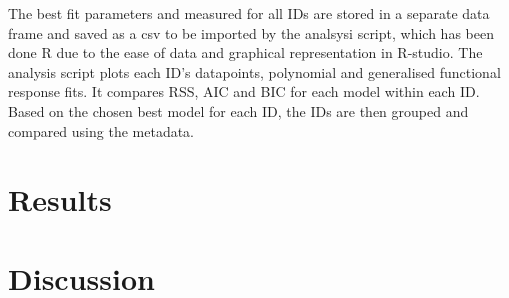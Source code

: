 \documentclass[11pt, a4paper, titlepage]{article}
\begin{document}
The best fit parameters and measured for all IDs are stored in a separate data frame and saved as a csv to be imported by the analsysi script, which has been done R due to the ease of data and graphical representation in R-studio. The analysis script plots each ID's datapoints, polynomial and generalised functional response fits. It compares RSS, AIC and BIC for each model within each ID. Based on the chosen best model for each ID, the IDs are then grouped and compared using the metadata.

\section{Results}

\section{Discussion}

\newpage
\printbibliography
\newpage
\end{document}
